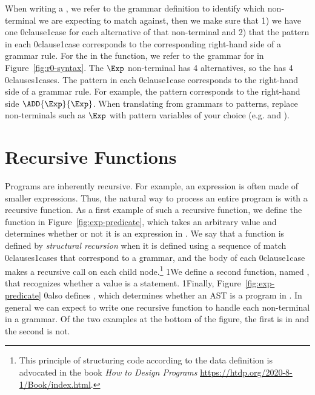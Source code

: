 \documentclass[7x10]{TimesAPriori_MIT}%
\def\racketEd{0}
\def\pythonEd{1}
\def\edition{1}
\newcommand{\racket}[1]{{\if\edition\racketEd{#1}\fi}}
\newcommand{\python}[1]{{\if\edition\pythonEd #1\fi}}
\begin{document}
When writing a , we refer to the grammar definition to
identify which non-terminal we are expecting to match against, then we
make sure that 1) we have one \racket{clause}\python{case} for each alternative of that
non-terminal and 2) that the pattern in each \racket{clause}\python{case} corresponds to the
corresponding right-hand side of a grammar rule. For the 
in the  function, we refer to the grammar for \LangInt{} in
Figure~\ref{fig:r0-syntax}. The $\Exp$ non-terminal has 4
alternatives, so the  has 4 \racket{clauses}\python{cases}.
The pattern in each \racket{clause}\python{case} corresponds to the right-hand side
of a grammar rule. For example, the pattern  corresponds to the
right-hand side $\ADD{\Exp}{\Exp}$. When translating from grammars to
patterns, replace non-terminals such as $\Exp$ with pattern variables
of your choice (e.g.  and ).


\section{Recursive Functions}
\label{sec:recursion}

Programs are inherently recursive. For example, an expression is often
made of smaller expressions. Thus, the natural way to process an
entire program is with a recursive function.  As a first example of
such a recursive function, we define the function  in
Figure~\ref{fig:exp-predicate}, which takes an arbitrary value and
determines whether or not it is an expression in \LangInt{}.
%
We say that a function is defined by \emph{structural recursion} when
it is defined using a sequence of match \racket{clauses}\python{cases}
that correspond to a grammar, and the body of each
\racket{clause}\python{case} makes a recursive call on each child
node.\footnote{This principle of structuring code according to the
  data definition is advocated in the book \emph{How to Design
    Programs} \url{https://htdp.org/2020-8-1/Book/index.html}.}
\python{We define a second function, named , that
  recognizes whether a value is a \LangInt{} statement.}
\python{Finally, } Figure~\ref{fig:exp-predicate} \racket{also}
defines , which determines whether an AST is a program in
\LangInt{}.  In general we can expect to write one recursive function
to handle each non-terminal in a grammar. Of the two examples at the bottom of the figure, the
first is in  and the second is not.
\end{document}
